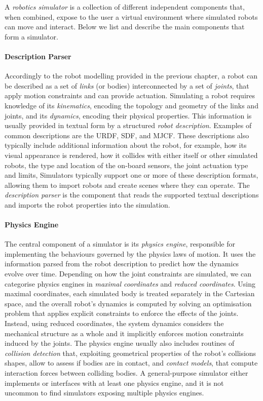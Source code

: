 A \emph{robotics simulator} is a collection of different independent components that, when combined, expose to the user a virtual environment where simulated robots can move and interact.
Below we list and describe the main components that form a simulator.

\paragraph{Description Parser}

Accordingly to the robot modelling provided in the previous chapter, a robot can be described as a set of \emph{links} (or bodies) interconnected by a set of \emph{joints}, that apply motion constraints and can provide actuation.
Simulating a robot requires knowledge of its \emph{kinematics}, encoding the topology and geometry of the links and joints, and its \emph{dynamics}, encoding their physical properties.
This information is usually provided in textual form by a structured \emph{robot description}.
Examples of common descriptions are the \ac{URDF}, \ac{SDF}, and \ac{MJCF}.
These descriptions also typically include additional information about the robot, for example, how its visual appearance is rendered, how it collides with either itself or other simulated robots, the type and location of the on-board sensors, the joint actuation type and limits, \etc
Simulators typically support one or more of these description formats, allowing them to import robots and create scenes where they can operate.
The \emph{description parser} is the component that reads the supported textual descriptions and imports the robot properties into the simulation.

\paragraph{Physics Engine}

The central component of a simulator is its \emph{physics engine}, responsible for implementing the behaviours governed by the physics laws of motion.
It uses the information parsed from the robot description to predict how the dynamics evolve over time.
Depending on how the joint constraints are simulated, we can categorise physics engines in \emph{maximal coordinates} and \emph{reduced coordinates}.
Using maximal coordinates, each simulated body is treated separately in the Cartesian space, and the overall robot's dynamics is computed by solving an optimisation problem that applies explicit constraints to enforce the effects of the joints.
Instead, using reduced coordinates, the system dynamics considers the mechanical structure as a whole and it implicitly enforces motion constraints induced by the joints.
The physics engine usually also includes routines of \emph{collision detection} that, exploiting geometrical properties of the robot's collisions shapes, allow to assess if bodies are in contact, and \emph{contact models}, that compute interaction forces between colliding bodies.
A general-purpose simulator either implements or interfaces with at least one physics engine, and it is not uncommon to find simulators exposing multiple physics engines.

